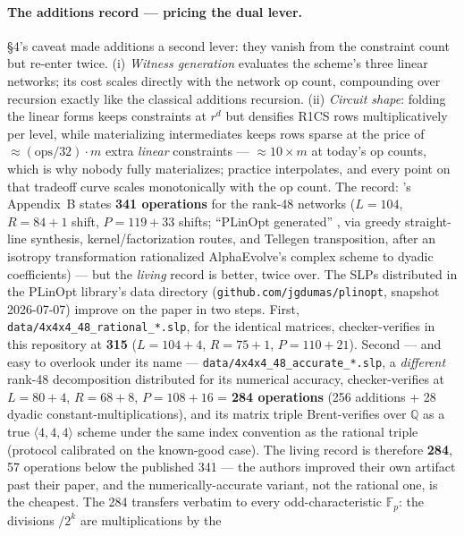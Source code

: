 \documentclass[10pt]{article}
\begin{document}
\paragraph{The additions record --- pricing the dual lever.}
\S4's caveat made additions a second lever: they vanish from the
constraint count but re-enter twice. (i) \emph{Witness
generation} evaluates the scheme's three linear networks; its cost
scales directly with the network op count, compounding over
recursion exactly like the classical additions recursion. (ii)
\emph{Circuit shape}: folding the linear forms keeps constraints
at $r^d$ but densifies R1CS rows multiplicatively per level, while
materializing intermediates keeps rows sparse at the price of
${\approx}(\text{ops}/32)\cdot m$ extra \emph{linear}
constraints --- ${\approx}10{\times}m$ at today's op counts,
which is why nobody fully materializes; practice interpolates,
and every point on that tradeoff curve scales monotonically with
the op count. The record: \cite{dps}'s Appendix~B states \textbf{341
operations} for the rank-48 networks ($L = 104$, $R = 84 + 1$
shift, $P = 119 + 33$ shifts; ``PLinOpt generated''
\cite{plinopt}, via greedy straight-line synthesis,
kernel/factorization routes, and Tellegen transposition, after an
isotropy transformation rationalized AlphaEvolve's complex scheme
to dyadic coefficients) --- but the \emph{living} record is
better, twice over. The SLPs distributed in the PLinOpt library's
data directory \cite{plinopt} (\texttt{github.com/jgdumas/plinopt},
snapshot 2026-07-07) improve on the paper in two steps. First,
\texttt{data/4x4x4\_48\_rational\_*.slp}, for the identical
matrices, checker-verifies in this repository at \textbf{315}
($L = 104{+}4$, $R = 75{+}1$, $P = 110{+}21$). Second --- and easy
to overlook under its name ---
\texttt{data/4x4x4\_48\_accurate\_*.slp}, a \emph{different}
rank-48 decomposition distributed for its numerical accuracy,
checker-verifies at $L = 80{+}4$, $R = 68{+}8$, $P = 108{+}16$ =
\textbf{284 operations} (256 additions + 28 dyadic
constant-multiplications), and its matrix triple Brent-verifies
over $\mathbb{Q}$ as a true $\langle 4,4,4\rangle$ scheme under
the same index convention as the rational triple (protocol
calibrated on the known-good case). The living record is
therefore \textbf{284}, 57 operations below the published 341 ---
the authors improved their own artifact past their paper, and the
numerically-accurate variant, not the rational one, is the
cheapest. The 284 transfers verbatim to every odd-characteristic
$\mathbb{F}_p$: the divisions $/2^k$ are multiplications by the
\end{document}
